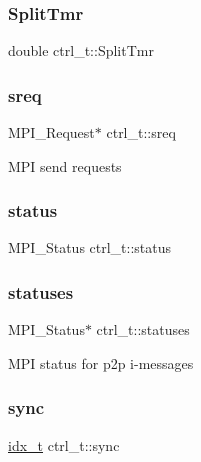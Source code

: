 \subsubsection{\texorpdfstring{Split\+Tmr}{SplitTmr}}
{\footnotesize\ttfamily double ctrl\+\_\+t\+::\+Split\+Tmr}

\mbox{\label{structctrl__t_ae549c3a5ecef32013a343de1561a77b3}} 
\subsubsection{\texorpdfstring{sreq}{sreq}}
{\footnotesize\ttfamily M\+P\+I\+\_\+\+Request$\ast$ ctrl\+\_\+t\+::sreq}

M\+PI send requests \mbox{\label{structctrl__t_ab427cd24d8541ee4958d3c03d48ab6c0}} 
\subsubsection{\texorpdfstring{status}{status}}
{\footnotesize\ttfamily M\+P\+I\+\_\+\+Status ctrl\+\_\+t\+::status}

\mbox{\label{structctrl__t_a25c50125554b92e1cd6e3bfb708c7da8}} 
\subsubsection{\texorpdfstring{statuses}{statuses}}
{\footnotesize\ttfamily M\+P\+I\+\_\+\+Status$\ast$ ctrl\+\_\+t\+::statuses}

M\+PI status for p2p i-\/messages \mbox{\label{structctrl__t_a3130cb526a3c01ab81dee30761168936}} 
\subsubsection{\texorpdfstring{sync}{sync}}
{\footnotesize\ttfamily \hyperlink{3rd_party_2parmetis-4_80_83_2metis_2include_2metis_8h_aaa5262be3e700770163401acb0150f52}{idx\+\_\+t} ctrl\+\_\+t\+::sync}

